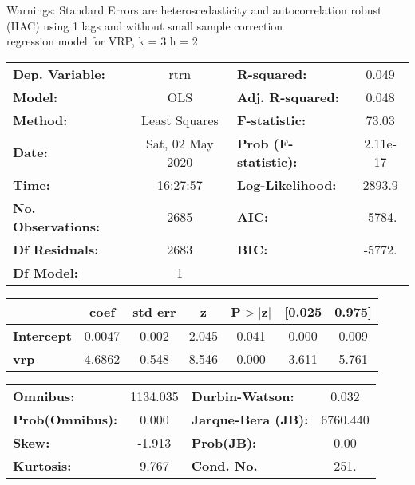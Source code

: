 Warnings: \newline
 [1] Standard Errors are heteroscedasticity and autocorrelation robust (HAC) using 1 lags and without small sample correction\\ 

regression model for VRP, k = 3 h = 2\begin{center}
\begin{tabular}{lclc}
\toprule
\textbf{Dep. Variable:}    &       rtrn       & \textbf{  R-squared:         } &     0.049   \\
\textbf{Model:}            &       OLS        & \textbf{  Adj. R-squared:    } &     0.048   \\
\textbf{Method:}           &  Least Squares   & \textbf{  F-statistic:       } &     73.03   \\
\textbf{Date:}             & Sat, 02 May 2020 & \textbf{  Prob (F-statistic):} &  2.11e-17   \\
\textbf{Time:}             &     16:27:57     & \textbf{  Log-Likelihood:    } &    2893.9   \\
\textbf{No. Observations:} &        2685      & \textbf{  AIC:               } &    -5784.   \\
\textbf{Df Residuals:}     &        2683      & \textbf{  BIC:               } &    -5772.   \\
\textbf{Df Model:}         &           1      & \textbf{                     } &             \\
\bottomrule
\end{tabular}
\begin{tabular}{lcccccc}
                   & \textbf{coef} & \textbf{std err} & \textbf{z} & \textbf{P$> |$z$|$} & \textbf{[0.025} & \textbf{0.975]}  \\
\midrule
\textbf{Intercept} &       0.0047  &        0.002     &     2.045  &         0.041        &        0.000    &        0.009     \\
\textbf{vrp}       &       4.6862  &        0.548     &     8.546  &         0.000        &        3.611    &        5.761     \\
\bottomrule
\end{tabular}
\begin{tabular}{lclc}
\textbf{Omnibus:}       & 1134.035 & \textbf{  Durbin-Watson:     } &    0.032  \\
\textbf{Prob(Omnibus):} &   0.000  & \textbf{  Jarque-Bera (JB):  } & 6760.440  \\
\textbf{Skew:}          &  -1.913  & \textbf{  Prob(JB):          } &     0.00  \\
\textbf{Kurtosis:}      &   9.767  & \textbf{  Cond. No.          } &     251.  \\
\bottomrule
\end{tabular}
\end{center}


